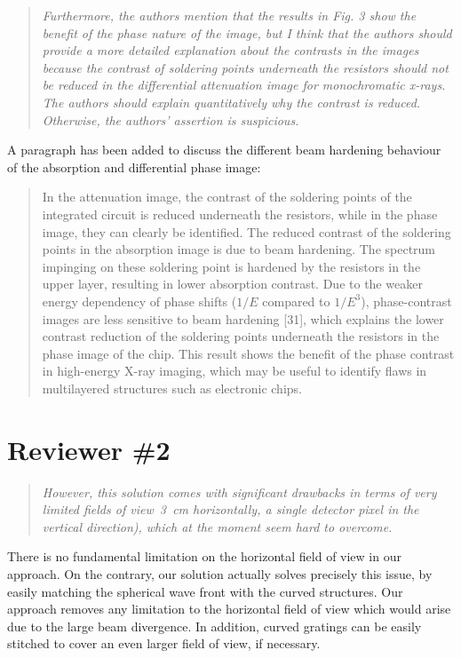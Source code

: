 \documentclass[a4paper,english]{scrartcl}
\newenvironment{reviewerquote}{\begin{quote}\itshape}{\end{quote}}
\begin{document}
\begin{reviewerquote}
    Furthermore, the authors mention that the results in Fig. 3 show the benefit of the phase nature of the image, but I think that the authors should provide a more detailed explanation about the contrasts in the images because the contrast of soldering points underneath the resistors should not be reduced in the differential attenuation image for monochromatic x-rays. The authors should explain quantitatively why the contrast is reduced. Otherwise, the authors' assertion is suspicious.
\end{reviewerquote}
A paragraph has been added to discuss the different beam hardening behaviour of
the absorption and differential phase image:
\begin{quote}
In the attenuation image, the contrast of the soldering points of the integrated circuit is reduced underneath the
resistors, while in the phase image, they can clearly be identified. The reduced contrast
of the soldering points in the absorption image is due to beam hardening. The spectrum
impinging on these soldering point is hardened by the resistors in the upper layer, resulting
in lower absorption contrast. Due to the weaker energy dependency of phase
shifts ($1/E$
compared to $1/E^3$), phase-contrast images are less sensitive to beam hardening [31], which
explains the lower contrast reduction of the soldering points underneath the resistors in the
phase image of the chip. This result shows the benefit of the phase contrast in high-energy
X-ray imaging, which may be useful to identify flaws in multilayered structures such as
electronic chips.
\end{quote}

\section*{Reviewer \#2}
\begin{reviewerquote}
    However, this solution comes with significant drawbacks in terms of very
    limited fields of view~\SI{3}{\centi\metre} horizontally, a single detector pixel in the vertical direction), which at the moment seem hard to overcome.
\end{reviewerquote}
There is no fundamental limitation on the horizontal field of view in our
approach. On the contrary, our solution actually solves precisely this
issue, by easily matching the spherical wave front with the curved
structures.
Our approach removes any limitation to the horizontal field of view which would arise due to the large beam divergence. In addition, curved gratings can be easily stitched to cover an even larger field of view, if necessary.
\end{document}
